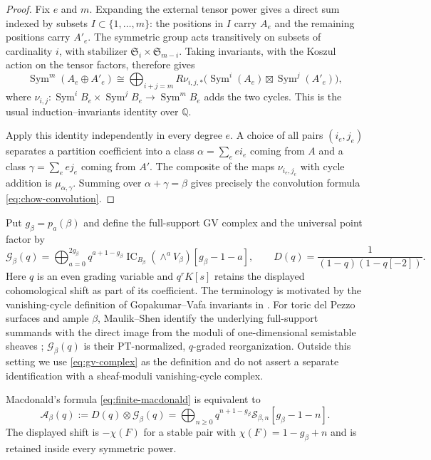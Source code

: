 \documentclass[11pt,reqno]{amsart}
\theoremstyle{definition}
\newcommand{\Q}{\mathbb Q}
\newcommand{\IC}{\operatorname{IC}}
\begin{document}
\begin{proof}
Fix $e$ and $m$.  Expanding the external tensor power gives a direct sum
indexed by subsets $I\subset\{1,\ldots,m\}$: the positions in $I$ carry
$A_e$ and the remaining positions carry $A'_e$.  The symmetric group acts
transitively on subsets of cardinality $i$, with stabilizer
$\mathfrak S_i\times\mathfrak S_{m-i}$.  Taking invariants, with the Koszul
action on the tensor factors, therefore gives
\[
 \operatorname{Sym}^m(A_e\oplus A'_e)
 \cong\bigoplus_{i+j=m}
 R\nu_{i,j,*}\bigl(\operatorname{Sym}^i(A_e)
 \boxtimes\operatorname{Sym}^j(A'_e)\bigr),
\]
where $\nu_{i,j}:\operatorname{Sym}^iB_e\times
\operatorname{Sym}^jB_e\to\operatorname{Sym}^mB_e$ adds the two cycles.
This is the usual induction--invariants identity over $\Q$.

Apply this identity independently in every degree $e$.  A choice of all
pairs $(i_e,j_e)$ separates a partition coefficient into a class
$\alpha=\sum_e e i_e$ coming from $A$ and a class
$\gamma=\sum_e e j_e$ coming from $A'$.  The composite of the maps
$\nu_{i_e,j_e}$ with cycle addition is
$\mu_{\alpha,\gamma}$.  Summing over $\alpha+\gamma=\beta$ gives precisely
the convolution formula \eqref{eq:chow-convolution}.
\end{proof}

Put $g_\beta=p_a(\beta)$ and define
the full-support GV complex and the universal point factor by
\begin{equation}\label{eq:gv-complex}
 \mathcal G_\beta(q)
 =\bigoplus_{a=0}^{2g_\beta}q^{a+1-g_\beta}
   \IC_{B_\beta}(\wedge^aV_\beta)[g_\beta-1-a],
 \qquad
 D(q)=\frac1{(1-q)(1-q[-2])}.
\end{equation}
Here $q$ is an even grading variable and $q^rK[s]$ retains the displayed
cohomological shift as part of its coefficient.  The terminology is
motivated by the vanishing-cycle definition of Gopakumar--Vafa invariants in
\cite{MaulikToda}.  For toric del Pezzo surfaces and ample $\beta$,
Maulik--Shen identify the underlying full-support summands with the direct
image from the moduli of one-dimensional semistable sheaves
\cite[Theorem~0.4]{MaulikShen}; $\mathcal G_\beta(q)$ is their PT-normalized,
$q$-graded reorganization.  Outside this setting we use
\eqref{eq:gv-complex} as the definition and do not assert a separate
identification with a sheaf-moduli vanishing-cycle complex.

Macdonald's formula \eqref{eq:finite-macdonald} is equivalent to
\begin{equation}\label{eq:normalized-macdonald-complex}
 \mathcal A_\beta(q):=D(q)\otimes\mathcal G_\beta(q)
 =\bigoplus_{n\ge0}q^{n+1-g_\beta}
   \mathcal S_{\beta,n}[g_\beta-1-n].
\end{equation}
The displayed shift is $-\chi(F)$ for a stable pair with
$\chi(F)=1-g_\beta+n$ and is retained inside every symmetric power.
\end{document}
